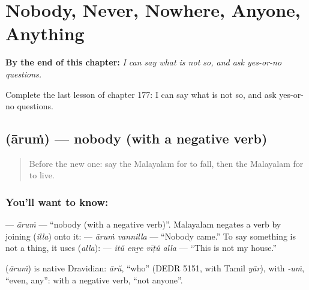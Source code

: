 
\chapter{Nobody, Never, Nowhere, Anyone, Anything}
\label{ch:ml-nobody-never-nowhere-anyone-anything}

\begin{chapteropening}
\textbf{By the end of this chapter:} \emph{I can say what is not so, and ask yes-or-no questions.}

Complete the last lesson of chapter 177: I can say what is not so, and ask yes-or-no questions.
\end{chapteropening}

\section[\texorpdfstring{\ml{ആരും} (āruṁ)}{ആരും (āruṁ)}]{ (āruṁ) — nobody (with a negative verb)}

\label{lesson:ML-C177-arum}



\begin{quote}
Before the new one: say the Malayalam for to fall, then the Malayalam for to live.
\end{quote}

\subsection*{You'll want to know: }
\textbf{} — \emph{āruṁ} — \textquotedblleft{}nobody (with a negative verb)\textquotedblright{}. Malayalam negates a verb by joining \textbf{} (\emph{illa}) onto it: \textbf{ } — \emph{āruṁ vannilla} — \textquotedblleft{}Nobody came.\textquotedblright{} To say something is not a thing, it uses \textbf{} (\emph{alla}): \textbf{   } — \emph{itŭ enṟe vīṭŭ alla} — \textquotedblleft{}This is not my house.\textquotedblright{}

\begin{cousinweb}
\textbf{} (\emph{āruṁ}) is native Dravidian: \emph{ārŭ}, \textquotedblleft{}who\textquotedblright{} (DEDR 5151, with Tamil \emph{yār}), with \emph{-uṁ}, \textquotedblleft{}even, any\textquotedblright{}: with a negative verb, \textquotedblleft{}not anyone\textquotedblright{}.
\end{cousinweb}

